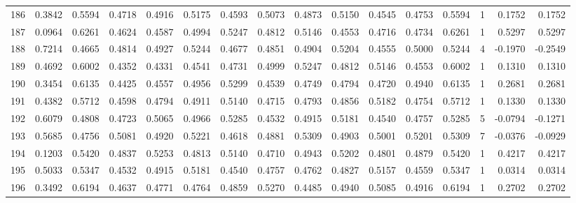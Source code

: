 \begin{tabular}{lrrrrrrrrrrrrrrr}
186 &      0.3842 &  0.5594 &  0.4718 &  0.4916 &  0.5175 &  0.4593 &  0.5073 &  0.4873 &  0.5150 &  0.4545 &   0.4753 &     0.5594 &      1 &                    0.1752 &                     0.1752 \\
187 &      0.0964 &  0.6261 &  0.4624 &  0.4587 &  0.4994 &  0.5247 &  0.4812 &  0.5146 &  0.4553 &  0.4716 &   0.4734 &     0.6261 &      1 &                    0.5297 &                     0.5297 \\
188 &      0.7214 &  0.4665 &  0.4814 &  0.4927 &  0.5244 &  0.4677 &  0.4851 &  0.4904 &  0.5204 &  0.4555 &   0.5000 &     0.5244 &      4 &                   -0.1970 &                    -0.2549 \\
189 &      0.4692 &  0.6002 &  0.4352 &  0.4331 &  0.4541 &  0.4731 &  0.4999 &  0.5247 &  0.4812 &  0.5146 &   0.4553 &     0.6002 &      1 &                    0.1310 &                     0.1310 \\
190 &      0.3454 &  0.6135 &  0.4425 &  0.4557 &  0.4956 &  0.5299 &  0.4539 &  0.4749 &  0.4794 &  0.4720 &   0.4940 &     0.6135 &      1 &                    0.2681 &                     0.2681 \\
191 &      0.4382 &  0.5712 &  0.4598 &  0.4794 &  0.4911 &  0.5140 &  0.4715 &  0.4793 &  0.4856 &  0.5182 &   0.4754 &     0.5712 &      1 &                    0.1330 &                     0.1330 \\
192 &      0.6079 &  0.4808 &  0.4723 &  0.5065 &  0.4966 &  0.5285 &  0.4532 &  0.4915 &  0.5181 &  0.4540 &   0.4757 &     0.5285 &      5 &                   -0.0794 &                    -0.1271 \\
193 &      0.5685 &  0.4756 &  0.5081 &  0.4920 &  0.5221 &  0.4618 &  0.4881 &  0.5309 &  0.4903 &  0.5001 &   0.5201 &     0.5309 &      7 &                   -0.0376 &                    -0.0929 \\
194 &      0.1203 &  0.5420 &  0.4837 &  0.5253 &  0.4813 &  0.5140 &  0.4710 &  0.4943 &  0.5202 &  0.4801 &   0.4879 &     0.5420 &      1 &                    0.4217 &                     0.4217 \\
195 &      0.5033 &  0.5347 &  0.4532 &  0.4915 &  0.5181 &  0.4540 &  0.4757 &  0.4762 &  0.4827 &  0.5157 &   0.4559 &     0.5347 &      1 &                    0.0314 &                     0.0314 \\
196 &      0.3492 &  0.6194 &  0.4637 &  0.4771 &  0.4764 &  0.4859 &  0.5270 &  0.4485 &  0.4940 &  0.5085 &   0.4916 &     0.6194 &      1 &                    0.2702 &                     0.2702 \\

\end{tabular}

